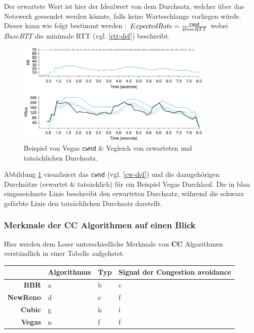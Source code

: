 \documentclass[paper=a4,fontsize=12pt,ngerman]{scrartcl}
\begin{document}
Der erwartete Wert ist hier der Idealwert von dem Durchsatz, welcher über das Netzwerk geesendet werden könnte, 
falls keine Warteschlange vorliegen würde. Dieser kann wie folgt bestimmt werden : 
$ ExpectedRate = \frac{\text{\texttt{cwnd}}}{BaseRTT}$ \cite{tcpccCh5}
wobei $BaseRTT$ die minimale RTT (vgl. \ref{rtt-def}) beschreibt.


\begin{figure}[ht] 
    \centering
    \includegraphics[height = 5cm]{./graphics/vegas.png}
    \caption{Beispiel von Vegas \texttt{cwnd} \& Vegleich von erwarteten und 
    tatsächlichen Durchsatz.\cite{tcpccCh5}} 
    \label{fig:vegasCWandThroughput}
\end{figure}

Abbildung \ref{fig:vegasCWandThroughput} visualisiert das \texttt{cwnd} (vgl. \ref{cw-def}) und die 
dazugehörigen Durchsätze (erwartet \& tatsächlich) für ein Beispiel Vegas Durchlauf.
Die in blau eingezeichnete Linie beschreibt den erwarteten Durchsatz, während die schwarz
gefärbte Linie den tatsächlichen Durchsatz darstellt.
 


\subsubsection{Merkmale der CC Algorithmen auf einen Blick}
Hier werden dem Leser unterschiedliche Merkmale von \textbf{CC} Algorithmen verständlich in einer 
Tabelle aufgelistet.

\begin{table}[ht]
\centering

\begin{tabular}{r|l|l|l}
   & \textbf{Algorithmus} & \textbf{Typ} & \textbf{Signal der Congestion avoidance} \\ \hline
\textbf{BBR} & a & b & c \\
\textbf{NewReno} & d & e & f \\
\textbf{Cubic} & g & h & i \\
\textbf{Vegas} & n & f & f 

\end{tabular}
\end{table}
\end{document}

